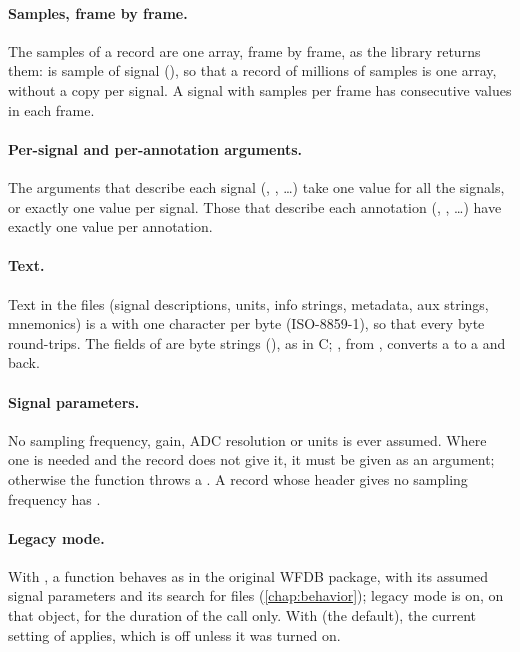 \paragraph{Samples, frame by frame.} The samples of a record are one array, frame by
frame, as the library returns them:  is sample  of
signal  (), so that a record of millions of samples is one
array, without a copy per signal. A signal with  samples per frame has
 consecutive values in each frame.

\paragraph{Per-signal and per-annotation arguments.} The arguments that describe each
signal (, , \ldots) take one value for all the signals, or exactly
one value per signal. Those that describe each annotation (, ,
\ldots) have exactly one value per annotation.

\paragraph{Text.} Text in the files (signal descriptions, units, info strings, metadata,
aux strings, mnemonics) is a  with one character per byte (ISO-8859-1), so
that every byte round-trips. The fields of  are byte strings
(), as in C; , from , converts a
 to a  and back.

\paragraph{Signal parameters.} No sampling frequency, gain, ADC resolution or units is
ever assumed. Where one is needed and the record does not give it, it must be given as an
argument; otherwise the function throws a . A record whose header
gives no sampling frequency has .

\paragraph{Legacy mode.} With , a function behaves as in the original
WFDB package, with its assumed signal parameters and its search for files
(\cref{chap:behavior}); legacy mode is on, on that  object, for the duration
of the call only. With  (the default), the current setting of
 applies, which is off unless it was turned on.


